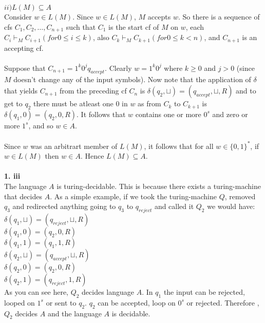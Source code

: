 \documentclass[a4paper,12pt]{article}
\begin{document}
\newpage
$ii) L(M) \subseteq A$ \\
Consider $w \in L(M)$. Since $w \in L(M)$, $M$ accepts $w$. So there is a sequence of cfs $C_1, C_2, \dots, C_{n+1}$ such that $C_1$ is the start cf of $M$ on $w$, each $C_i \vdash_M C_{i+1} (for 0 \leq i \leq k)$, also $C_k \vdash_M C_{k+1} (for 0 \leq k < n)$, and $C_{n+1}$ is an accepting cf. \\
\\
Suppose that $C_{n+1} = 1^k 0^j q_{accept}$. Clearly $w = 1^k 0^j$ where $k \geq 0$ and $j > 0$ (since $M$ doesn't change any of the input symbols). Now note that the application of $\delta$ that yields $C_{n+1}$ from the preceding cf $C_n$ is $\delta(q_2, \sqcup) = (q_{accept}, \sqcup, R)$ and to get to $q_2$ there must be atleast one $0$ in $w$ as from $C_k$ to $C_{k+1}$ is $\delta(q_1, 0) = (q_2, 0, R)$. It follows that $w$ contains one or more $0^s$ and zero or more $1^s$, and so $w \in A$. \\
\\
Since $w$ was an arbitrart member of $L(M)$, it follows that for all $w \in \{0, 1\}^*$, if $w \in L(M)$ then $w \in A$. Hence $L(M) \subseteq A$. \\
\\
\textbf{1. iii} \\
The language $A$ is turing-decidable. This is because there exists a turing-machine that decides $A$. As a simple example, if we took the turing-machine $Q$, removed $q_3$ and redirected anything going to $q_3$ to $q_{reject}$ and called it $Q_2$ we would have: \\
$\delta ( q_1 , \sqcup ) = ( q_{reject} , \sqcup , R )$ \\
$\delta ( q_1 , 0 ) = ( q_2 , 0 , R )$ \\
$\delta ( q_1 , 1 ) = ( q_1 , 1 , R )$ \\
$\delta ( q_2 , \sqcup ) = ( q_{accept} , \sqcup , R )$ \\
$\delta ( q_2 , 0 ) = ( q_2 , 0 , R )$ \\
$\delta ( q_2 , 1 ) = ( q_{reject} , 1 , R )$ \\
As you can see here, $Q_2$ decides language $A$. In $q_1$ the input can be rejected, looped on $1^s$ or sent to $q_2$. $q_2$ can be accepted, loop on $0^s$ or rejected. Therefore , $Q_2$ decides $A$ and the language $A$ is decidable.\\
\newpage
\end{document}
